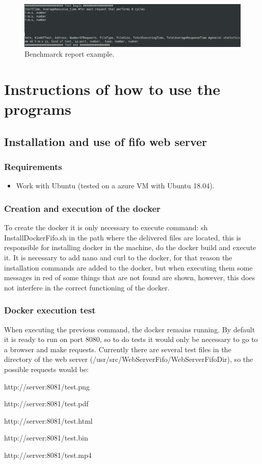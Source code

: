 \documentclass{article}
\begin{document}
\begin{figure}[H]
	\centering
	\captionsetup{justification=centering, margin=1cm}
    \includegraphics[width=\columnwidth]{images/benchReportExamp.png}
    \caption{Benchmarck report example.}
	\label{fig:benchReportExamp}
\end{figure}

\section{Instructions of how to use the programs}

\subsection{Installation and use of fifo web server}
\subsubsection{Requirements}
\begin{itemize}
    \item Work with Ubuntu (tested on a azure VM with Ubuntu 18.04).
\end{itemize}

\subsubsection{Creation and execution of the docker}
To create the docker it is only necessary to execute command: sh InstallDockerFifo.sh in the path where the delivered files are located, this is responsible for installing docker in the machine, do the docker build and execute it. It is necessary to add nano and curl to the docker, for that reason the installation commands are added to the docker, but when executing them some messages in red of some things that are not found are shown, however, this does not interfere in the correct functioning of the docker.

\subsubsection{Docker execution test}
When executing the previous command, the docker remains running. By default it is ready to run on port 8080, so to do tests it would only be necessary to go to a browser and make requests. Currently there are several test files in the directory of the web server (/usr/src/WebServerFifo/WebServerFifoDir), so the possible requests would be:\\
\centerline{http://server:8081/test.png}
\centerline{http://server:8081/test.pdf}
\centerline{http://server:8081/test.html}
\centerline{http://server:8081/test.bin}
\centerline{http://server:8081/test.mp4}
		
\end{document}
